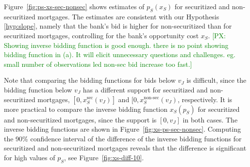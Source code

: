 \documentclass[11pt,twopage]{article}
\newcommand{\PX}[1]{\textcolor{green}{[PX: #1]}}
\begin{document}


Figure~\ref{fig:ps-xs-sec-nonsec} shows estimates of $p_S(x_S)$ for
securitized and non-securitized mortgages. The estimates are
consistent with our Hypothesis \ref{hyp:slope}, namely that the bank's
bid is higher for non-securitized than for securitized mortgages,
controlling for the bank's opportunity cost $x_S$. \PX{Showing inverse bidding function is good enough. 
there is no point showing bidding function in (a). It will elicit unnecessary questions and challenges. eg. small number of observations led non-sec bid increase too fast.}

Note that comparing the bidding functions for bids below $v_J$ is
difficult, since the bidding function below $v_J$ has a different
support for securitized and non-securitized mortgages, $[0,x_S^\text{sec}(v_J)]$
and $[0,x_S^\text{non-sec}(v_J)$, respectively. It is more
practical to compare the inverse bidding function $x_S(p_S)$ for
securitized and non-securitized mortgages, since the support is
$[0,v_J]$ in both cases. The inverse bidding functions are shown in
Figure~\ref{fig:xs-ps-sec-nonsec}. Computing the 90\% confidence
interval of the difference of the inverse bidding functions for
securitized and non-securitized mortgages reveals that the difference
is significant for high values of $p_S$, see
Figure~\ref{fig:xs-diff-10}.
\end{document}
